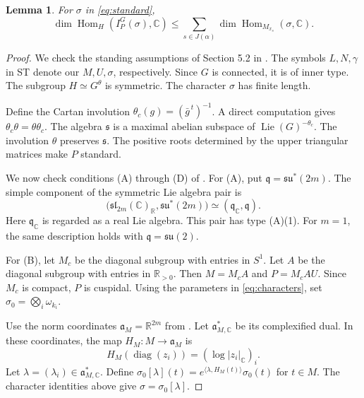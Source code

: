 \documentclass[11pt]{amsart}
\newcommand{\C}{\mathbb C}
\newcommand{\R}{\mathbb R}
\DeclareMathOperator{\Hom}{Hom}
\DeclareMathOperator{\diag}{diag}
\DeclareMathOperator{\Lie}{Lie}
\newcommand{\IP}{I_P^G}
\newtheorem{lemma}[theorem]{Lemma}
\numberwithin{equation}{section}
\begin{document}
\begin{lemma}\label{lem:ST}
For $\sigma$ in \eqref{eq:standard},
\begin{equation}\label{eq:estimate}
 \dim\Hom_H(\IP(\sigma),\C)
 \le\sum_{s\in J(\alpha)}\dim\Hom_{M_{x_s}}(\sigma,\C).
\end{equation}
\end{lemma}

\begin{proof}
We check the standing assumptions of Section 5.2 in \cite{ST}.
The symbols $L,N,\gamma$ in ST denote our $M,U,\sigma$,
respectively.
Since $G$ is connected, it is of inner type.
The subgroup $H\simeq G^\theta$ is symmetric.
The character $\sigma$ has finite length.

Define the Cartan involution $\theta_c(g)=(\bar g^{\,t})^{-1}$.
A direct computation gives $\theta_c\theta=\theta\theta_c$.
The algebra $\mathfrak s$ is a maximal abelian subspace of
$\Lie(G)^{-\theta_c}$.
The involution $\theta$ preserves $\mathfrak s$.
The positive roots determined by the upper triangular matrices
make $P$ standard.

We now check conditions (A) through (D) of
\cite[Section~5.3]{ST}.
For (A), put $\mathfrak q=\mathfrak{su}^*(2m)$.
The simple component of the symmetric Lie algebra pair is
\[
 \bigl(\mathfrak{sl}_{2m}(\C)_\R,\mathfrak{su}^*(2m)\bigr)
 \simeq(\mathfrak q_\C,\mathfrak q).
\]
Here $\mathfrak q_\C$ is regarded as a real Lie algebra.
This pair has type (A)(1).
For $m=1$, the same description holds with
$\mathfrak q=\mathfrak{su}(2)$.

For (B), let $M_c$ be the diagonal subgroup with entries in $S^1$.
Let $A$ be the diagonal subgroup with entries in $\R_{>0}$.
Then $M=M_cA$ and $P=M_cAU$.
Since $M_c$ is compact, $P$ is cuspidal.
Using the parameters in \eqref{eq:characters}, set
$\sigma_0=\bigotimes_i\omega_{k_i}$.

Use the norm coordinates $\mathfrak a_M=\R^{2m}$ from \cite{MOYglobal}.
Let $\mathfrak a_{M,\C}^*$ be its complexified dual.
In these coordinates, the map $H_M:M\to\mathfrak a_M$ is
\[
 H_M(\diag(z_i))=(\log|z_i|_\C)_i.
\]
Let $\lambda=(\lambda_i)\in\mathfrak a_{M,\C}^*$.
Define $\sigma_0[\lambda](t)=e^{\langle\lambda,H_M(t)\rangle}\sigma_0(t)$
for $t\in M$.
The character identities above give $\sigma=\sigma_0[\lambda]$.


\end{proof}
\end{document}
